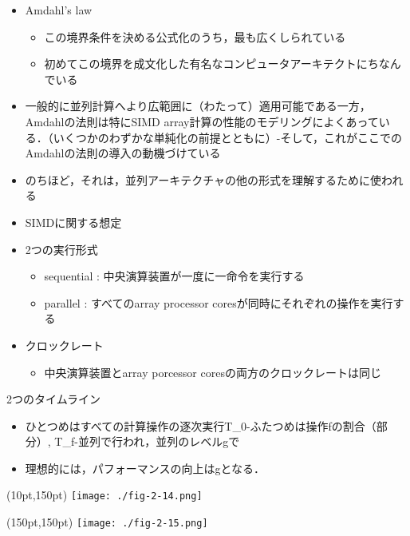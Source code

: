 \documentclass[12pt, unicode, dvipdfmx]{beamer}
\begin{document}
\begin{frame}[t]
	\begin{itemize}
		\item Amdahl's law
		\begin{itemize}
			\item この境界条件を決める公式化のうち，最も広くしられている
			\item 初めてこの境界を成文化した有名なコンピュータアーキテクトにちなんでいる
		\end{itemize}
	\item 一般的に並列計算へより広範囲に（わたって）適用可能である一方，Amdahlの法則は特にSIMD array計算の性能のモデリングによくあっている．（いくつかのわずかな単純化の前提とともに）-そして，これがここでのAmdahlの法則の導入の動機づけている
	\item のちほど，それは，並列アーキテクチャの他の形式を理解するために使われる
	\end{itemize}
\end{frame}

\begin{frame}[t]
	\begin{itemize}
		\item SIMDに関する想定
		\item 2つの実行形式
		\begin{itemize}
			\item sequential : 中央演算装置が一度に一命令を実行する
			\item parallel : すべてのarray processor coresが同時にそれぞれの操作を実行する
		\end{itemize}
	\item クロックレート
		\begin{itemize}
			\item 中央演算装置とarray porcessor coresの両方のクロックレートは同じ
		\end{itemize}
	\end{itemize}
\end{frame}

\begin{frame}[t]
	2つのタイムライン
	\begin{itemize}
		\item ひとつめはすべての計算操作の逐次実行T\_0-ふたつめは操作fの割合（部分）, T\_f-並列で行われ，並列のレベルgで
		\item 理想的には，パフォーマンスの向上はgとなる．
	\end{itemize}
	\begin{textblock*}{0.5\linewidth}(10pt,150pt)
		\centering
		\texttt{[image: ./fig-2-14.png]}
	\end{textblock*}
	\begin{textblock*}{0.5\linewidth}(150pt,150pt)
		\centering
		\texttt{[image: ./fig-2-15.png]}
	\end{textblock*}
\end{frame}
\end{document}
